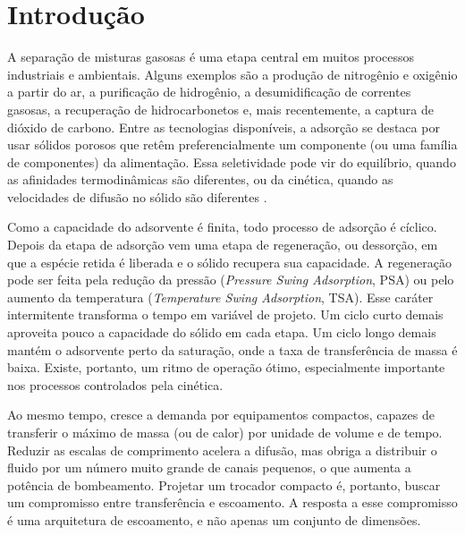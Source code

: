 %
\section{Introdução}
\label{sec:introducao}

A separação de misturas gasosas é uma etapa central em muitos processos
industriais e ambientais. Alguns exemplos são a produção de nitrogênio e
oxigênio a partir do ar, a purificação de hidrogênio, a desumidificação de
correntes gasosas, a recuperação de hidrocarbonetos e, mais recentemente, a
captura de dióxido de carbono. Entre as tecnologias disponíveis, a adsorção se
destaca por usar sólidos porosos que retêm preferencialmente um componente (ou
uma família de componentes) da alimentação. Essa seletividade pode vir do
equilíbrio, quando as afinidades termodinâmicas são diferentes, ou da cinética,
quando as velocidades de difusão no sólido são diferentes
\cite{ruthven1984,ruthven1994}.

Como a capacidade do adsorvente é finita, todo processo de adsorção é cíclico.
Depois da etapa de adsorção vem uma etapa de regeneração, ou dessorção, em que
a espécie retida é liberada e o sólido recupera sua capacidade. A regeneração
pode ser feita pela redução da pressão (\textit{Pressure Swing Adsorption},
PSA) ou pelo aumento da temperatura (\textit{Temperature Swing Adsorption},
TSA). Esse caráter intermitente transforma o tempo em variável de projeto. Um
ciclo curto demais aproveita pouco a capacidade do sólido em cada etapa. Um
ciclo longo demais mantém o adsorvente perto da saturação, onde a taxa de
transferência de massa é baixa. Existe, portanto, um ritmo de operação ótimo,
especialmente importante nos processos controlados pela cinética.

Ao mesmo tempo, cresce a demanda por equipamentos compactos, capazes de
transferir o máximo de massa (ou de calor) por unidade de volume e de tempo.
Reduzir as escalas de comprimento acelera a difusão, mas obriga a distribuir o
fluido por um número muito grande de canais pequenos, o que aumenta a potência
de bombeamento. Projetar um trocador compacto é, portanto, buscar um
compromisso entre transferência e escoamento. A resposta a esse compromisso é
uma arquitetura de escoamento, e não apenas um conjunto de dimensões.

